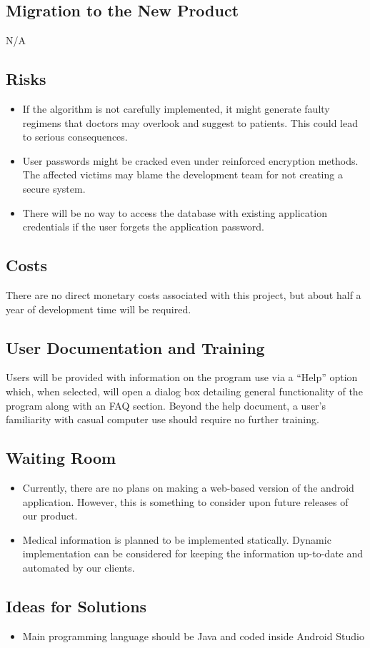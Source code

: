 \documentclass[12pt]{article}
\begin{document}
\subsection{Migration to the New Product }
N/A

\subsection{Risks}
\begin{itemize}
\item If the algorithm is not carefully implemented, it might generate faulty regimens that doctors may overlook and suggest to patients. This could lead to serious consequences.
\item User passwords might be cracked even under reinforced encryption methods. The affected victims may blame the development team for not creating a secure system.
\item There will be no way to access the database with existing application credentials if the user forgets the application password.
\end{itemize}

\subsection{Costs}
There are no direct monetary costs associated with this project, but about half a year of development time will be required.

\subsection{User Documentation and Training}
Users will be provided with information on the program use via a “Help” option which, when selected, will open a dialog box detailing general functionality of the program along with an FAQ section. Beyond the help document, a user’s familiarity with casual computer use should require no further training.

\subsection{Waiting Room}
\begin{itemize}
\item Currently, there are no plans on making a web-based version of the android application. However, this is something to consider upon future releases of our product.
\item Medical information is planned to be implemented statically. Dynamic implementation can be considered for keeping the information up-to-date  and automated by our clients.
\end{itemize}

\subsection{Ideas for Solutions}
\begin{itemize}
\item Main programming language should be Java and coded inside Android Studio
\end{itemize}
\end{document}
